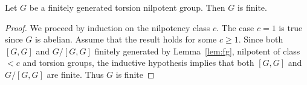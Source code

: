 \begin{theorem}
	\label{thm:T(G)finito}
	Let $G$ be a finitely generated torsion nilpotent group. Then
	$G$ is finite.  	
\end{theorem}

\begin{proof}
	We proceed by induction on the nilpotency class $c$. The case $c=1$ is true since $G$ is abelian. Assume 
	that the result holds for some $c\geq1$.  Since both $[G,G]$ and $G/[G,G]$ 
	finitely generated by Lemma~\ref{lem:fg}, 
	nilpotent of class 
	$<c$ and torsion groups, the inductive hypothesis implies that both $[G,G]$ and $G/[G,G]$ are finite. Thus $G$
	is finite
\end{proof}

%

%
%
%


